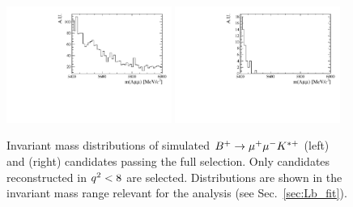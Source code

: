 \begin{figure}
\centering
\includegraphics[width=0.48\textwidth]{Lmumu/figs/Bu2Kstplus_mass.pdf}
\includegraphics[width=0.48\textwidth]{Lmumu/figs/JpsiL_leakage_mass.pdf}
\caption{ Invariant mass distributions of simulated $B^{+} \rightarrow{\ensuremath{\mu^+\mu^-}} K^{*+}$ (left)
and \Lb\to\jpsi\Lz (right) candidates passing the full selection. Only \Lb\to\jpsi\Lz
candidates reconstructed in ${q^2} < 8$ \gevgevcccc are selected.
Distributions are shown in the invariant mass range relevant for the analysis 
(see Sec.~\ref{sec:Lb_fit}). }
\label{fig:peakingBkgs}
\end{figure}

